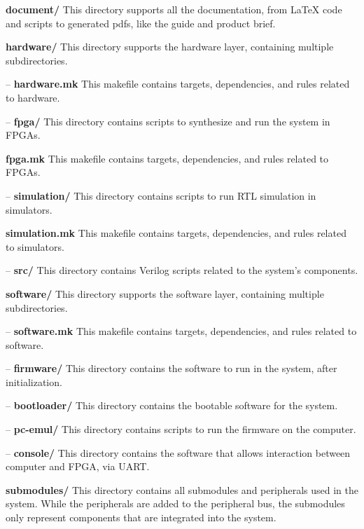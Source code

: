 \textbf{document/} This directory supports all the documentation, from LaTeX code and scripts to generated pdfs, like the guide and product brief.

\textbf{hardware/} This directory supports the hardware layer, containing multiple subdirectories.

\hspace{0.5cm} – \textbf{hardware.mk} This makefile contains targets, dependencies, and rules related to hardware.

\hspace{0.5cm} – \textbf{fpga/} This directory contains scripts to synthesize and run the system in FPGAs.

\hspace{1.2cm}\textbf{fpga.mk} This makefile contains targets, dependencies, and rules related to FPGAs.

\hspace{0.5cm} – \textbf{simulation/} This directory contains scripts to run RTL simulation in simulators.

\hspace{1.2cm}\textbf{simulation.mk} This makefile contains targets, dependencies, and rules related to simulators.

\hspace{0.5cm}– \textbf{src/} This directory contains Verilog scripts related to the system’s components.

\textbf{software/} This directory supports the software layer, containing multiple subdirectories.

\hspace{0.5cm}– \textbf{software.mk} This makefile contains targets, dependencies, and rules related to software.

\hspace{0.5cm}– \textbf{firmware/} This directory contains the software to run in the system, after initialization.

\hspace{0.5cm}– \textbf{bootloader/} This directory contains the bootable software for the system.

\hspace{0.5cm}– \textbf{pc-emul/} This directory contains scripts to run the firmware on the computer.

\hspace{0.5cm}– \textbf{console/} This directory contains the software that allows interaction between computer and FPGA, via UART.

\textbf{submodules/} This directory contains all submodules and peripherals used in the system. While the peripherals are added to the peripheral bus, the submodules only represent components that are integrated into the system. 

